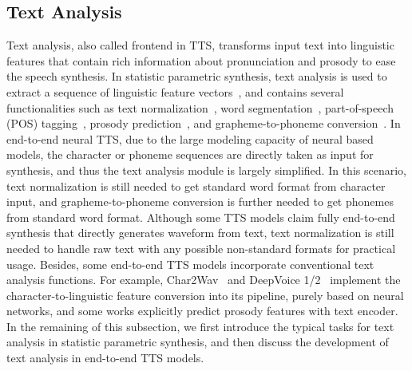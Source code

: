 \documentclass{article}
\begin{document}
\subsection{Text Analysis}
\label{sec_funda_ta}
Text analysis, also called frontend in TTS, transforms input text into linguistic features that contain rich information about pronunciation and prosody to ease the speech synthesis. In statistic parametric synthesis, text analysis is used to extract a sequence of linguistic feature vectors~\cite{tokuda2013speech}, and contains several functionalities such as text normalization~\cite{sproat2016rnn,zhang2020hybrid}, word segmentation~\cite{xue2003chinese}, part-of-speech (POS) tagging~\cite{schlunz2010effects}, prosody prediction~\cite{chu2001locating}, and grapheme-to-phoneme conversion~\cite{yao2015sequence}. In end-to-end neural TTS, due to the large modeling capacity of neural based models, the character or phoneme sequences are directly taken as input for synthesis, and thus the text analysis module is largely simplified. In this scenario, text normalization is still needed to get standard word format from character input, and grapheme-to-phoneme conversion is further needed to get phonemes from standard word format. Although some TTS models claim fully end-to-end synthesis that directly generates waveform from text, text normalization is still needed to handle raw text with any possible non-standard formats for practical usage. Besides, some end-to-end TTS models incorporate conventional text analysis functions. For example, Char2Wav~\cite{sotelo2017char2wav} and DeepVoice 1/2~\cite{arik2017deep,gibiansky2017deep} implement the character-to-linguistic feature conversion into its pipeline, purely based on neural networks, and some works\cite{stanton2018predicting} explicitly predict prosody features with text encoder. In the remaining of this subsection, we first introduce the typical tasks for text analysis in statistic parametric synthesis, and then discuss the development of text analysis in end-to-end TTS models. 
\end{document}
